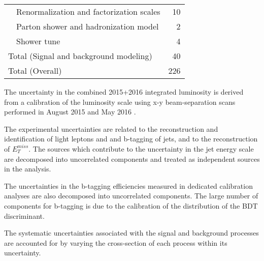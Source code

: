 \begin{table}[h]
\begin{tabular}{lr}
\ \ Renormalization and factorization scales    & 10                  \\
\ \ Parton shower and hadronization model               & 2                   \\
\ \ Shower tune                         & 4                   \\
\hline
Total (Signal and background modeling)       & 40                    \\
\hline\hline
Total (Overall)                             & 226             \\
\hline\hline
\end{tabular}
\label{tab:SystSummary}
\end{table}

The uncertainty in the combined 2015+2016 integrated luminosity is derived from a calibration of the luminosity scale using x-y beam-separation scans performed in August 2015 and May 2016 \cite{lumi}.

The experimental uncertainties are related to the reconstruction and identification of light leptons and and b-tagging of jets, and to the reconstruction of $E^{miss}_T$. The sources which contribute to the uncertainty in the jet energy scale \cite{jes} are decomposed into uncorrelated components and treated as independent sources in the analysis. 

The uncertainties in the b-tagging efficiencies measured in dedicated calibration analyses \cite{btag_cal} are also decomposed into uncorrelated components. The large number of components for b-tagging is due to the calibration of the distribution of the BDT discriminant.

The systematic uncertainties associated with the signal and background processes are accounted for by varying the cross-section of each process within its uncertainty.
